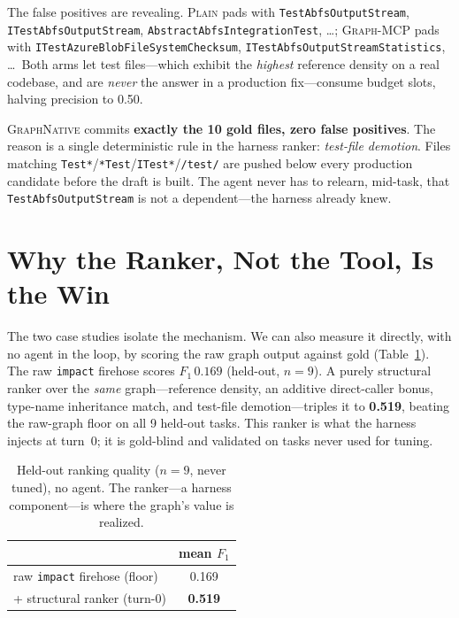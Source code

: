 \documentclass[11pt,twocolumn]{article}
\newcommand{\best}[1]{\textbf{#1}}
\newcommand{\gn}{{\normalfont\scshape GraphNative}}
\newcommand{\mcp}{{\normalfont\scshape Graph-MCP}}
\newcommand{\plain}{{\normalfont\scshape Plain}}
\begin{document}
The false positives are revealing. \plain{} pads with \texttt{TestAbfsOutputStream},
\texttt{ITestAbfsOutputStream}, \texttt{AbstractAbfsIntegrationTest}, \ldots; \mcp{} pads with
\texttt{ITestAzureBlobFileSystemChecksum}, \texttt{ITestAbfsOutputStreamStatistics}, \ldots\ Both
arms let test files---which exhibit the \emph{highest} reference density on a real codebase, and are
\emph{never} the answer in a production fix---consume budget slots, halving precision to 0.50.

\gn{} commits \best{exactly the 10 gold files, zero false positives}. The reason is a single
deterministic rule in the harness ranker: \emph{test-file demotion}. Files matching
\texttt{Test*}/\texttt{*Test}/\texttt{ITest*}/\texttt{/test/} are pushed below every production
candidate before the draft is built. The agent never has to relearn, mid-task, that
\texttt{TestAbfsOutputStream} is not a dependent---the harness already knew.

\section{Why the Ranker, Not the Tool, Is the Win}

The two case studies isolate the mechanism. We can also measure it directly, with no agent in the
loop, by scoring the raw graph output against gold (Table~\ref{tab:ranker}). The raw \texttt{impact}
firehose scores $F_1\,0.169$ (held-out, $n{=}9$). A purely structural ranker over the \emph{same}
graph---reference density, an additive direct-caller bonus, type-name inheritance match, and
test-file demotion---triples it to \best{0.519}, beating the raw-graph floor on all 9 held-out tasks.
This ranker is what the harness injects at turn~0; it is gold-blind and validated on tasks never used
for tuning.

\begin{table}[h]\centering\footnotesize
\setlength{\tabcolsep}{6pt}
\renewcommand{\arraystretch}{1.1}
\caption{Held-out ranking quality ($n{=}9$, never tuned), no agent. The ranker---a harness
component---is where the graph's value is realized.}\label{tab:ranker}
\begin{tabular}{lc}
\toprule
 & mean $F_1$ \\
\midrule
raw \texttt{impact} firehose (floor) & 0.169 \\
\;+ structural ranker (turn-0) & \best{0.519} \\
\bottomrule
\end{tabular}
\end{table}
\end{document}
